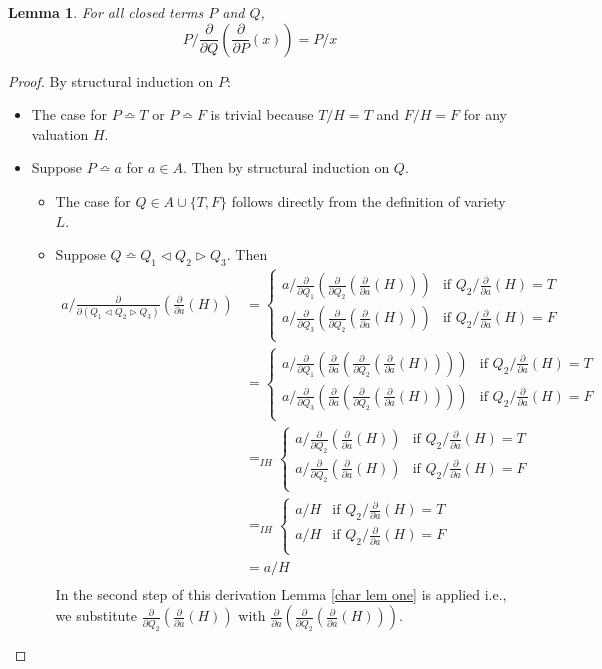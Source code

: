 \documentclass[a4paper,twoside,openright]{report}
\newcommand{\dd}[1]{\frac{\partial}{\partial #1}}
\newcommand{\syn}{\bumpeq}
\newcommand{\lef}{\ensuremath{\triangleleft}}
\newcommand{\rig}{\ensuremath{\triangleright}}
\newtheorem{lem}[theorem]{Lemma}
\begin{document}
\begin{lem}\label{char lem two}
For all closed terms $P$ and $Q$,
\[
P/\dd Q(\dd P(x)) = P/x
\]
\end{lem}
\begin{proof}
By structural induction on $P$:
\begin{itemize}
\item The case for $P\syn T$ or $P\syn F$ is trivial because $T/H=T$ and
$F/H=F$ for any valuation $H$.
\item Suppose $P\syn a$ for $a\in A$. Then by structural induction on $Q$.
\begin{itemize}
\item The case for $Q\in A\cup\{T,F\}$ follows directly from
the definition of variety $L$.
\item Suppose $Q\syn Q_1\lef Q_2\rig Q_3$. Then
\begin{align*}
a/\dd{(Q_1\lef Q_2\rig Q_3)}(\dd a(H))
&=\begin{cases}
a/\dd{Q_1}(\dd{Q_2}(\dd a(H))) & \text{if $Q_2/\dd a(H)=T$}\\
a/\dd{Q_3}(\dd{Q_2}(\dd a(H))) & \text{if $Q_2/\dd a(H)=F$}\\
\end{cases}\\
&=\begin{cases}
a/\dd{Q_1}(\dd a(\dd{Q_2}(\dd a(H)))) & \text{if $Q_2/\dd a(H)=T$}\\
a/\dd{Q_3}(\dd a(\dd{Q_2}(\dd a(H)))) & \text{if $Q_2/\dd a(H)=F$}\\
\end{cases}\\
&=_{IH}\begin{cases}
a/\dd{Q_2}(\dd a(H)) & \text{if $Q_2/\dd a(H)=T$}\\
a/\dd{Q_2}(\dd a(H)) & \text{if $Q_2/\dd a(H)=F$}\\
\end{cases}\\
&=_{IH}\begin{cases}
a/H & \text{if $Q_2/\dd a(H)=T$}\\
a/H & \text{if $Q_2/\dd a(H)=F$}\\
\end{cases}\\
&= a/H\\
\end{align*}
In the second step of this derivation Lemma \ref{char lem
one} is applied i.e., we substitute $\dd{Q_2}(\dd a(H))$ with $\dd
a(\dd{Q_2}(\dd a(H)))$.
\end{itemize}

\end{itemize}
\end{proof}
\end{document}
